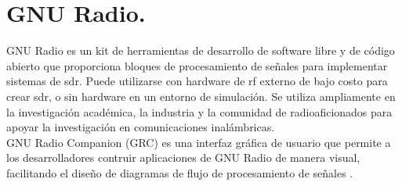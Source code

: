 \section*{\fontsize{12}{18}\selectfont GNU Radio.}

\begin{justify}
    GNU Radio es un kit de herramientas de desarrollo de software libre y de código abierto que proporciona bloques
    de procesamiento de señales para implementar sistemas de \gls{sdr}. Puede utilizarse con hardware de \gls{rf} externo
    de bajo costo para crear \gls{sdr}, o sin hardware en un entorno de simulación. Se utiliza ampliamente en la investigación
    académica, la industria y la comunidad de radioaficionados para apoyar la investigación en comunicaciones inalámbricas.\\

    GNU Radio Companion (GRC) es una interfaz gráfica de usuario que permite a los desarrolladores contruir aplicaciones
    de GNU Radio de manera visual, facilitando el diseño de diagramas de flujo de procesamiento de señales \parencite{gnuradio}.
\end{justify}
